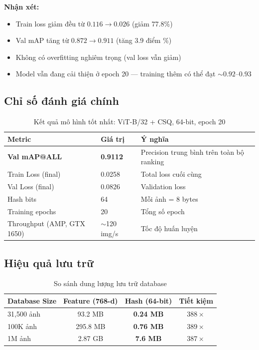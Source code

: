 \documentclass[13pt,a4paper]{article}
\begin{document}
\textbf{Nhận xét:}
\begin{itemize}
    \item Train loss giảm đều từ $0.116 \to 0.026$ (giảm 77.8\%)
    \item Val mAP tăng từ $0.872 \to 0.911$ (tăng 3.9 điểm \%)
    \item Không có overfitting nghiêm trọng (val loss vẫn giảm)
    \item Model vẫn đang cải thiện ở epoch 20 --- training thêm có thể đạt $\sim 0.92$--$0.93$
\end{itemize}


\subsection{Chỉ số đánh giá chính}

\begin{table}[H]
\centering
\caption{Kết quả mô hình tốt nhất: ViT-B/32 + CSQ, 64-bit, epoch 20}
\label{tab:main_results}
\begin{tabular}{lll}
\toprule
\textbf{Metric} & \textbf{Giá trị} & \textbf{Ý nghĩa} \\
\midrule
\textbf{Val mAP@ALL}       & \textbf{0.9112}   & Precision trung bình trên toàn bộ ranking \\
Train Loss (final)          & 0.0258             & Total loss cuối cùng \\
Val Loss (final)            & 0.0826             & Validation loss \\
Hash bits                   & 64                 & Mỗi ảnh = 8 bytes \\
Training epochs             & 20                 & Tổng số epoch \\
Throughput (AMP, GTX 1650)  & $\sim$120 img/s    & Tốc độ huấn luyện \\
\bottomrule
\end{tabular}
\end{table}


\subsection{Hiệu quả lưu trữ}

\begin{table}[H]
\centering
\caption{So sánh dung lượng lưu trữ database}
\label{tab:storage}
\begin{tabular}{lccc}
\toprule
\textbf{Database Size} & \textbf{Feature (768-d)} & \textbf{Hash (64-bit)} & \textbf{Tiết kiệm} \\
\midrule
31{,}500 ảnh  & 93.2 MB    & \textbf{0.24 MB}  & $388\times$ \\
100K ảnh      & 295.8 MB   & \textbf{0.76 MB}  & $389\times$ \\
1M ảnh        & 2.87 GB    & \textbf{7.6 MB}   & $387\times$ \\
\bottomrule
\end{tabular}
\end{table}
\end{document}
